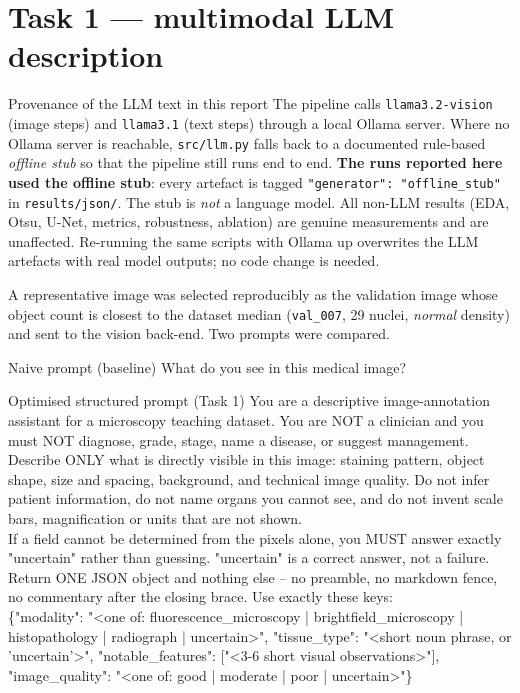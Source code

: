 \documentclass[a4paper,9pt,twocolumn]{extarticle}
\begin{document}
\section{Task 1 --- multimodal LLM description}

\begin{prompt}{Provenance of the LLM text in this report}
\scriptsize
The pipeline calls \texttt{llama3.2-vision} (image steps) and
\texttt{llama3.1} (text steps) through a local Ollama server. Where no Ollama
server is reachable, \texttt{src/llm.py} falls back to a documented rule-based
\emph{offline stub} so that the pipeline still runs end to end. \textbf{The runs
reported here used the offline stub}: every artefact is tagged
\texttt{"generator": "offline\_stub"} in \texttt{results/json/}. The stub is
\emph{not} a language model. All non-LLM results (EDA, Otsu, U-Net, metrics,
robustness, ablation) are genuine measurements and are unaffected. Re-running
the same scripts with Ollama up overwrites the LLM artefacts with real model
outputs; no code change is needed.
\end{prompt}

A representative image was selected reproducibly as the validation image whose
object count is closest to the dataset median (\texttt{val\_007}, 29 nuclei,
\textit{normal} density) and sent to the vision back-end. Two prompts were
compared.

\begin{prompt}{Naive prompt (baseline)}
\scriptsize\ttfamily What do you see in this medical image?
\end{prompt}

\begin{prompt}{Optimised structured prompt (Task 1)}
\scriptsize\ttfamily
You are a descriptive image-annotation assistant for a microscopy teaching
dataset. You are NOT a clinician and you must NOT diagnose, grade, stage, name a
disease, or suggest management.\\[2pt]
Describe ONLY what is directly visible in this image: staining pattern, object
shape, size and spacing, background, and technical image quality. Do not infer
patient information, do not name organs you cannot see, and do not invent scale
bars, magnification or units that are not shown.\\[2pt]
If a field cannot be determined from the pixels alone, you MUST answer exactly
"uncertain" rather than guessing. "uncertain" is a correct answer, not a
failure.\\[2pt]
Return ONE JSON object and nothing else -- no preamble, no markdown fence, no
commentary after the closing brace. Use exactly these keys:\\[2pt]
\{"modality": "<one of: fluorescence\_microscopy | brightfield\_microscopy |
histopathology | radiograph | uncertain>", "tissue\_type": "<short noun phrase,
or 'uncertain'>", "notable\_features": ["<3-6 short visual observations>"],
"image\_quality": "<one of: good | moderate | poor | uncertain>"\}
\end{prompt}
\end{document}
